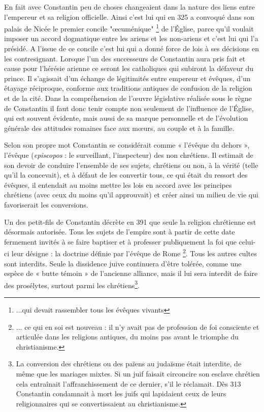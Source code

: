 En fait avec Constantin peu de choses changeaient dans la nature des liens entre l'empereur et sa religion officielle. Ainsi c'est lui qui en 325 a convoqué dans son palais de Nicée le premier concile "œcuménique"
\footnote{...qui devait rassembler tous les évêques vivants} 
de l'Église, parce qu'il voulait imposer un accord dogmatique entre les ariens et les non-ariens et c'est lui qui l'a présidé. A l'issue de ce concile c'est lui qui a donné force de lois à ses décisions en les contresignant. Lorsque l'un des successeurs de Constantin aura pris fait et cause pour l'hérésie arienne ce seront les catholiques qui subiront la défaveur du prince. Il s'agissait d'un échange de légitimités entre empereur et évêques, d'un étayage réciproque, conforme aux traditions antiques de confusion de la religion et de la cité. Dans la compréhension de l'œuvre législative réalisée sous le règne de Constantin il faut donc tenir compte non seulement de l'influence de l'Église, qui est souvent évidente, mais aussi de sa marque personnelle et de l'évolution générale des attitudes romaines face aux mœurs, au couple et à la famille. 

 Selon son propre mot Constantin se considérait comme « l'évêque du dehors », l'évêque (\emph{episcopos} : le surveillant, l'inspecteur) des non chrétiens. Il estimait de son devoir de conduire l'ensemble de ses sujets, chrétiens ou non, à la vérité (telle qu'il la concevait), et à défaut de les convertir tous, ce qui était du ressort des évêques, il entendait au moins mettre les lois en accord avec les principes chrétiens (avec ceux du moins qu'il approuvait) et créer ainsi un milieu de vie qui favoriserait les conversions.
 
 Un des petit-fils de Constantin décrète en 391 que seule la religion chrétienne est désormais autorisée. Tous les sujets de l'empire sont à partir de cette date fermement invités à se faire baptiser et à professer publiquement la foi que celui-ci leur désigne : la doctrine définie par l'évêque de Rome \footnote{... ce qui en soi est nouveau : il n'y avait pas de profession de foi consciente et articulée dans les religions antiques, du moins pas avant le triomphe du christianisme.}. Tous les autres cultes sont interdits. Seule la dissidence juive continuera d'être tolérée, comme une espèce de « butte témoin » de l'ancienne alliance, mais il lui sera interdit de faire des prosélytes, surtout parmi les chrétiens\footnote{La conversion des chrétiens ou des païens au judaïsme était interdite, de même que les mariages mixtes. Si un juif faisait circoncire son esclave chrétien cela entraînait  l'affranchissement de ce dernier, s'il le réclamait. Dès 313 Constantin condamnait à mort les juifs qui lapidaient ceux de leurs religionnaires qui se convertissaient au christianisme.}. 

